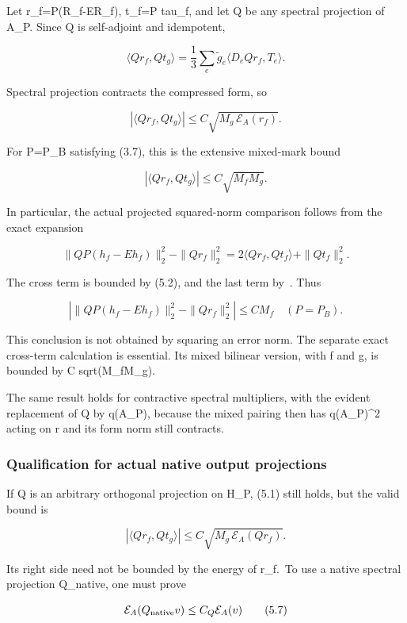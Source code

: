 \documentclass[
  11pt,
]{article}
\begin{document}
Let r\_f=P(R\_f-ER\_f), t\_f=P tau\_f, and let Q be any spectral
projection of A\_P. Since Q is self-adjoint and idempotent,

\[
 \langle Qr_f,Qt_g\rangle
 =\frac13\sum_e\widetilde g_e
      \langle D_eQr_f,T_e\rangle.
 \tag{5.1}
\]

Spectral projection contracts the compressed form, so

\[
 \boxed{\quad
 |\langle Qr_f,Qt_g\rangle|
 \le C\sqrt{M_g\,\mathcal E_A(r_f)}.
 \quad}
 \tag{5.2}
\]

For P=P\_B satisfying (3.7), this is the extensive mixed-mark bound

\[
 |\langle Qr_f,Qt_g\rangle|
 \le C\sqrt{M_fM_g}.
 \tag{5.3}
\]

In particular, the actual projected squared-norm comparison follows from
the exact expansion

\[
 \|QP(h_f-Eh_f)\|_2^2-\|Qr_f\|_2^2
 =2\langle Qr_f,Qt_f\rangle+\|Qt_f\|_2^2.
 \tag{5.4}
\]

The cross term is bounded by (5.2), and the last term by~\cite{CT}. Thus

\[
 \boxed{\quad
 \left|\|QP(h_f-Eh_f)\|_2^2-\|Qr_f\|_2^2\right|
 \le CM_f
 \quad(P=P_B).
 \quad}
 \tag{5.5}
\]

This conclusion is not obtained by squaring an error norm. The separate
exact cross-term calculation is essential. Its mixed bilinear version,
with f and g, is bounded by C sqrt(M\_fM\_g).

The same result holds for contractive spectral multipliers, with the
evident replacement of Q by q(A\_P), because the mixed pairing then has
q(A\_P)\^{}2 acting on r and its form norm still contracts.

\hypertarget{qualification-for-actual-native-output-projections}{%
\subsubsection{Qualification for actual native output
projections}\label{qualification-for-actual-native-output-projections}}

If Q is an arbitrary orthogonal projection on H\_P, (5.1) still holds,
but the valid bound is

\[
 |\langle Qr_f,Qt_g\rangle|
 \le C\sqrt{M_g\,\mathcal E_A(Qr_f)}.
 \tag{5.6}
\]

Its right side need not be bounded by the energy of r\_f.~To use a
native spectral projection Q\_native, one must prove

\[
 \mathcal E_A(Q_{\rm native}v)\le C_Q\mathcal E_A(v)
 \tag{5.7}
\]
\end{document}
